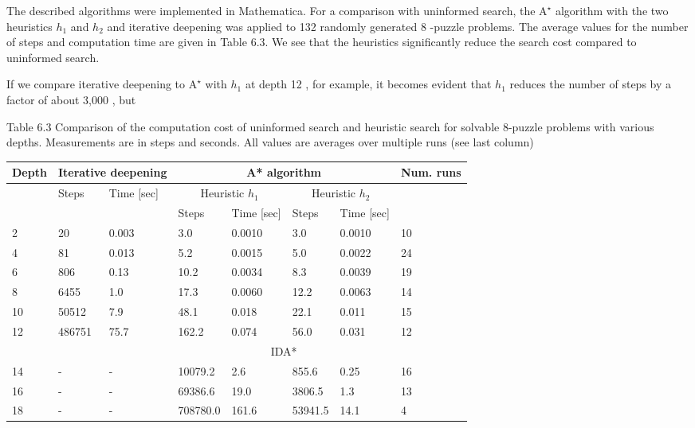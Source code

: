 \documentclass[10pt]{article}
\begin{document}
The described algorithms were implemented in Mathematica. For a comparison with uninformed search, the $\mathrm{A}^{\star}$ algorithm with the two heuristics $h_{1}$ and $h_{2}$ and iterative deepening was applied to 132 randomly generated 8 -puzzle problems. The average values for the number of steps and computation time are given in Table 6.3. We see that the heuristics significantly reduce the search cost compared to uninformed search.

If we compare iterative deepening to $\mathrm{A}^{\star}$ with $h_{1}$ at depth 12 , for example, it becomes evident that $h_{1}$ reduces the number of steps by a factor of about 3,000 , but

Table 6.3 Comparison of the computation cost of uninformed search and heuristic search for solvable 8-puzzle problems with various depths. Measurements are in steps and seconds. All values are averages over multiple runs (see last column)

\begin{center}
\begin{tabular}{|l|l|l|l|l|l|l|l|}
\hline
\multirow[t]{3}{*}{Depth} & \multicolumn{2}{|c|}{Iterative deepening} & \multicolumn{4}{|c|}{A* algorithm} & \multirow[t]{3}{*}{Num. runs} \\
\hline
 & \multirow[t]{2}{*}{Steps} & \multirow{2}{*}{Time [sec]} & \multicolumn{2}{|c|}{Heuristic $h_{1}$} & \multicolumn{2}{|c|}{Heuristic $h_{2}$} &  \\
\hline
 &  &  & Steps & Time [sec] & Steps & Time [sec] &  \\
\hline
2 & 20 & 0.003 & 3.0 & 0.0010 & 3.0 & 0.0010 & 10 \\
\hline
4 & 81 & 0.013 & 5.2 & 0.0015 & 5.0 & 0.0022 & 24 \\
\hline
6 & 806 & 0.13 & 10.2 & 0.0034 & 8.3 & 0.0039 & 19 \\
\hline
8 & 6455 & 1.0 & 17.3 & 0.0060 & 12.2 & 0.0063 & 14 \\
\hline
10 & 50512 & 7.9 & 48.1 & 0.018 & 22.1 & 0.011 & 15 \\
\hline
\multirow[t]{2}{*}{12} & \multirow[t]{2}{*}{486751} & \multirow[t]{2}{*}{75.7} & 162.2 & 0.074 & 56.0 & 0.031 & \multirow[t]{2}{*}{12} \\
\hline
 &  &  & \multicolumn{4}{|c|}{IDA*} &  \\
\hline
14 & - & - & 10079.2 & 2.6 & 855.6 & 0.25 & 16 \\
\hline
16 & - & - & 69386.6 & 19.0 & 3806.5 & 1.3 & 13 \\
\hline
18 & - & - & 708780.0 & 161.6 & 53941.5 & 14.1 & 4 \\
\hline
\end{tabular}
\end{center}
\end{document}
